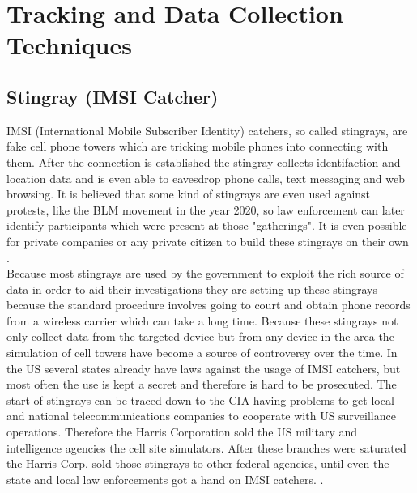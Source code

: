 \documentclass{report}
\begin{document}
	
	\section{Tracking and Data Collection Techniques}
	\startsection
		\subsection{Stingray (IMSI Catcher)}
		\startsubsection
			IMSI (International Mobile Subscriber Identity) catchers, so called stingrays, are fake cell phone towers which are tricking mobile phones into connecting with them. After the connection is established the stingray collects identifaction and location data and is even able to eavesdrop phone calls, text messaging and web browsing. It is believed that some kind of stingrays are even used against protests, like the BLM movement in the year 2020, so law enforcement can later identify participants which were present at those "gatherings". It is even possible for private companies or any private citizen to build these stingrays on their own \cite{PiP}. \\
			Because most stingrays are used by the government to exploit the rich source of data in order to aid their investigations they are setting up these stingrays because the standard procedure involves going to court and obtain phone records from a wireless carrier which can take a long time. Because these stingrays not only collect data from the targeted device but from any device in the area the simulation of cell towers have become a source of controversy over the time. In the US several states already have laws against the usage of IMSI catchers, but most often the use is kept a secret and therefore is hard to be prosecuted. The start of stingrays can be traced down to the CIA having problems to get local and national telecommunications companies to cooperate with US surveillance operations. Therefore the Harris Corporation sold the US military and intelligence agencies the cell site simulators. After these branches were saturated the Harris Corp. sold those stingrays to other federal agencies, until even the state and local law enforcements got a hand on IMSI catchers. \cite{IMSI}.
		\closesection
\end{document}

